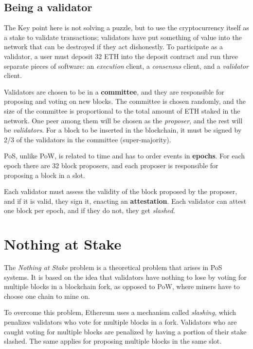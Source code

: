 \subsection{Being a validator}
The Key point here is not solving a puzzle, but to use the cryptocurrency itself as a stake to validate transactions; 
validators have put something of value into the network that can be destroyed if they act dishonestly.
To participate as a validator, a user must deposit 32 ETH into the deposit contract and run three separate pieces of software: an \textit{execution} client, a \textit{consensus} client, and a \textit{validator} client.

Validators are chosen to be in a \textbf{committee}, and they are responsible for proposing and voting on new blocks. The committee is chosen randomly, and the size of the committee is proportional to the total amount of ETH staked in the network.
One peer among them will be chosen as the \textit{proposer}, and the rest will be \textit{validators}.
For a block to be inserted in the blockchain, it must be signed by 2/3 of the validators in the committee (super-majority).

PoS, unlike PoW, is related to time and has to order events in \textbf{epochs}.
For each epoch there are 32 block proposers, and each proposer is responsible for proposing a block in a slot.

Each validator must assess the validity of the block proposed by the proposer, and if it is valid, they sign it, enacting an \textbf{attestation}.
Each validator can attest one block per epoch, and if they do not, they get \textit{slashed}.

\section{Nothing at Stake}

The \textit{Nothing at Stake} problem is a theoretical problem that arises in PoS systems. It is based on the idea that validators have nothing to lose by voting for multiple blocks in a blockchain fork, as opposed to PoW, where miners have to choose one chain to mine on.

To overcome this problem, Ethereum uses a mechanism called \textit{slashing}, which penalizes validators who vote for multiple blocks in a fork. Validators who are caught voting for multiple blocks are penalized by having a portion of their stake slashed.
The same applies for proposing multiple blocks in the same slot.

